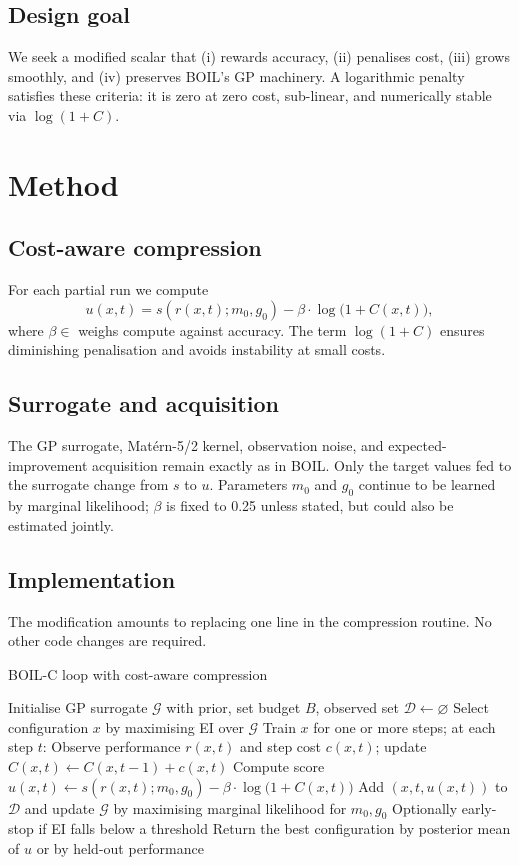 \documentclass{article} %
\begin{document}
\subsection{Design goal}
We seek a modified scalar that (i) rewards accuracy, (ii) penalises cost, (iii) grows smoothly, and (iv) preserves BOIL's GP machinery. A logarithmic penalty satisfies these criteria: it is zero at zero cost, sub-linear, and numerically stable via \(\log(1+C)\).

\section{Method}
\label{sec:method}
\subsection{Cost-aware compression}
For each partial run we compute
\[
 u(x,t)=s(r(x,t);m_0,g_0)-\beta\cdot\log\bigl(1+C(x,t)\bigr),
\]
where \(\beta\in\) weighs compute against accuracy. The term \(\log(1+C)\) ensures diminishing penalisation and avoids instability at small costs.

\subsection{Surrogate and acquisition}
The GP surrogate, Mat\'ern-5/2 kernel, observation noise, and expected-improvement acquisition remain exactly as in BOIL. Only the target values fed to the surrogate change from \(s\) to \(u\). Parameters \(m_0\) and \(g_0\) continue to be learned by marginal likelihood; \(\beta\) is fixed to 0.25 unless stated, but could also be estimated jointly.

\subsection{Implementation}
The modification amounts to replacing one line in the compression routine. No other code changes are required.

\begin{algorithm}
\caption{BOIL-C loop with cost-aware compression}
\begin{algorithmic}[1]
\State Initialise GP surrogate \(\mathcal{G}\) with prior, set budget \(B\), observed set \(\mathcal{D}\leftarrow\varnothing\)
  \State Select configuration \(x\) by maximising EI over \(\mathcal{G}\)
  \State Train \(x\) for one or more steps; at each step \(t\):
  \State \hspace{1em} Observe performance \(r(x,t)\) and step cost \(c(x,t)\); update \(C(x,t)\leftarrow C(x,t-1)+c(x,t)\)
  \State \hspace{1em} Compute score \(u(x,t)\leftarrow s(r(x,t);m_0,g_0)-\beta\cdot\log\bigl(1+C(x,t)\bigr)\)
  \State \hspace{1em} Add \((x,t,u(x,t))\) to \(\mathcal{D}\) and update \(\mathcal{G}\) by maximising marginal likelihood for \(m_0,g_0\)
  \State Optionally early-stop if EI falls below a threshold
\EndWhile
\State Return the best configuration by posterior mean of \(u\) or by held-out performance
\end{algorithmic}
\end{algorithm}
\end{document}
